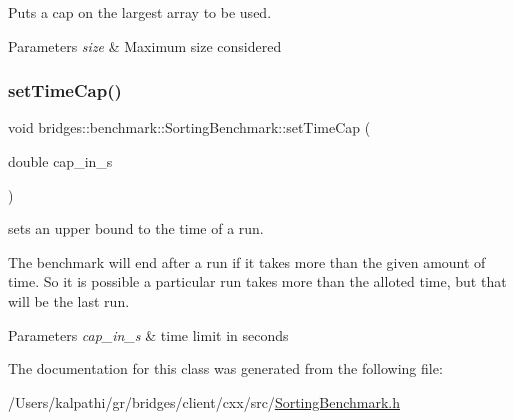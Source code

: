 Puts a cap on the largest array to be used. 


\begin{DoxyParams}{Parameters}
{\em size} & Maximum size considered \\
\hline
\end{DoxyParams}
\mbox{\label{classbridges_1_1benchmark_1_1_sorting_benchmark_a59b95f2510d62ac5a31bb33d472fdffc}} 
\subsubsection{\texorpdfstring{set\+Time\+Cap()}{setTimeCap()}}
{\footnotesize\ttfamily void bridges\+::benchmark\+::\+Sorting\+Benchmark\+::set\+Time\+Cap (\begin{DoxyParamCaption}\item[{double}]{cap\+\_\+in\+\_\+s }\end{DoxyParamCaption})\hspace{0.3cm}{\ttfamily [inline]}}



sets an upper bound to the time of a run. 

The benchmark will end after a run if it takes more than the given amount of time. So it is possible a particular run takes more than the alloted time, but that will be the last run.


\begin{DoxyParams}{Parameters}
{\em cap\+\_\+in\+\_\+s} & time limit in seconds \\
\hline
\end{DoxyParams}


The documentation for this class was generated from the following file\+:\begin{DoxyCompactItemize}
\item 
/\+Users/kalpathi/gr/bridges/client/cxx/src/\mbox{\hyperlink{_sorting_benchmark_8h}{Sorting\+Benchmark.\+h}}\end{DoxyCompactItemize}
